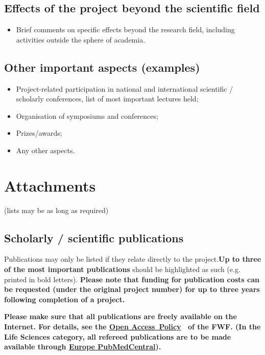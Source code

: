 \documentclass[a4paper, 11pt]{article}
\begin{document}
\subsection{Effects of the project beyond the scientific field}

\begin{itemize}
\item Brief comments on specific effects beyond the research field, including
activities outside the sphere of academia. 
\end{itemize}

\subsection{Other important aspects (examples)}

\begin{itemize}
\item Project-related participation in national and international scientific /
scholarly conferences, list of most important lectures held;
\item Organisation of symposiums and conferences; 
\item Prizes/awards;
\item Any other aspects.
\end{itemize}

\newpage
\section{Attachments}
\setcounter{subsection}{0}

(lists may be as long as required)

\subsection{Scholarly / scientific publications}

Publications may only be listed if they relate directly to the project.\textbf{Up to
three of the most important publications} should be highlighted as such (e.g.
printed in bold letters).
\textbf{Please note that funding for publication costs can be requested (under the
original project number) for up to three years following completion of a
project.}

\textbf{Please make sure that all publications are freely available on the
Internet. For details, see the
\href{http://www.fwf.ac.at/en/research-funding/open-access-policy/}{Open Access Policy} 
of the FWF. (In the Life Sciences category,
all refereed publications are to be made available through
\href{http://www.fwf.ac.at/fileadmin/files/Dokumente/Open\_Access/pubmed.pdf}{Europe
PubMedCentral}).}
\end{document}
